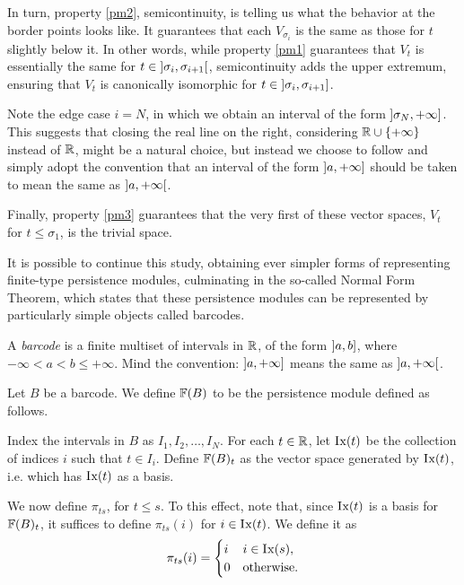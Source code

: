 In turn, property \ref{pm2}, semicontinuity, is telling us what the behavior at the border points looks like. It guarantees that each $V_{\sigma_i}$ is the same as those for $t$ slightly below it. In other words, while property \ref{pm1} guarantees that $V_t$ is essentially the same for $t \in \ointerval{\sigma_i}{\sigma_{i+1}}$, semicontinuity adds the upper extremum, ensuring that $V_t$ is canonically isomorphic for $t \in \linterval{\sigma_i}{\sigma_{i+1}}$.

Note the edge case $i = N$, in which we obtain an interval of the form $\linterval{\sigma_N}{+\infty}$. This suggests that closing the real line on the right, considering $\mathbb{R} \cup \{+\infty\}$ instead of $\mathbb{R}$, might be a natural choice, but instead we choose to follow \cite{polterovich} and simply adopt the convention that an interval of the form $\linterval{a}{+\infty}$ should be taken to mean the same as $\ointerval{a}{+\infty}$.

Finally, property \ref{pm3} guarantees that the very first of these vector spaces, $V_t$ for $t \leq \sigma_1$, is the trivial space.

It is possible to continue this study, obtaining ever simpler forms of representing finite-type persistence modules, culminating in the so-called Normal Form Theorem, which states that these persistence modules can be represented by particularly simple objects called barcodes.

\begin{definition}
A \emph{barcode} is a finite multiset of intervals in $\mathbb{R}$, of the form $\linterval a b$, where $-\infty < a < b \leq +\infty$. Mind the convention: $\linterval a {+\infty}$ means the same as $\ointerval a {+\infty}$.
\end{definition}

\begin{definition}\label{def:pmfrombarcode}
Let $B$ be a barcode. We define $\mathbb{F}(B)$ to be the persistence module defined as follows.

Index the intervals in $B$ as $I_1, I_2, \dots, I_N$. For each $t \in \mathbb{R}$, let $\mathop{\mathrm{I\mkern0.7mu x}}(t)$ be the collection of indices $i$ such that $t \in I_i$. Define $\mathbb{F}(B)_t$ as the vector space generated by $\mathop{\mathrm{I\mkern0.7mu x}}(t)$, i.e. which has $\mathop{\mathrm{I\mkern0.7mu x}}(t)$ as a basis.

We now define $\pi_{ts}$, for $t \leq s$. To this effect, note that, since $\mathop{\mathrm{I\mkern0.7mu x}}(t)$ is a basis for $\mathbb{F}(B)_t$, it suffices to define $\pi_{ts}(i)$ for $i \in \mathop{\mathrm{I\mkern0.7mu x}}(t)$. We define it as
\begin{equation}
\pi_{ts}(i) = \begin{cases} i & i \in \mathop{\mathrm{I\mkern0.7mu x}}(s),\\ 0 & \text{otherwise}. \end{cases}
\end{equation}
\end{definition}

